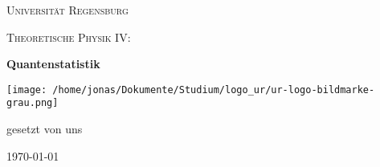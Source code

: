 \begin{titlepage}
	\centering
	{\scshape \LARGE Universität Regensburg \par}
	\vspace{1cm}
	{\scshape\Large Theoretische Physik IV: \par}
	\vspace{1.5cm}
	{\huge\bfseries Quantenstatistik \par}
	\vspace{2cm}
	\texttt{[image: /home/jonas/Dokumente/Studium/logo\_ur/ur-logo-bildmarke-grau.png]}\par
	\vfill
	{\large gesetzt von uns\par}
	\vfill
	{\large \today\par}
\end{titlepage}
